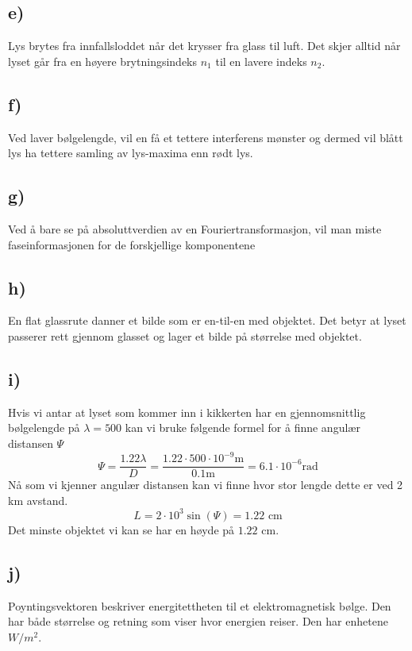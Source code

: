 \documentclass{article}
\begin{document}
  \subsection*{e)}
    Lys brytes fra innfallsloddet når det krysser fra glass til luft. Det skjer alltid når lyset går fra en høyere brytningsindeks $n_1$ til en lavere indeks $n_2$. 
  
  \subsection*{f)}
    Ved laver bølgelengde, vil en få et tettere interferens mønster og dermed vil blått lys ha tettere samling av lys-maxima enn rødt lys. 
    
  \subsection*{g)}
    Ved å bare se på absoluttverdien av en Fouriertransformasjon, vil man miste faseinformasjonen for de forskjellige komponentene
  
  \subsection*{h)}
    En flat glassrute danner et bilde som er en-til-en med objektet. Det betyr at lyset passerer rett gjennom glasset og lager et bilde på størrelse med objektet. 
    
  \subsection*{i)}
    Hvis vi antar at lyset som kommer inn i kikkerten har en gjennomsnittlig bølgelengde på $λ = 500$ kan vi bruke følgende formel for å finne angulær distansen $Ψ$
    \[
    Ψ = \frac{1.22 λ}{D} = \frac{1.22 ⋅ 500 ⋅ 10^{-9} \text{m}}{0.1 \text{m}} = 6.1 ⋅ 10^{-6} \text{rad} 
    \]
    Nå som vi kjenner angulær distansen kan vi finne hvor stor lengde dette er ved 2 km avstand. 
    \[
    L = 2 ⋅ 10^3 \sin (Ψ) = 1.22 \text{ cm}
    \]
    Det minste objektet vi kan se har en høyde på $1.22$ cm. 
  
  \subsection*{j)}
    Poyntingsvektoren beskriver energitettheten til et elektromagnetisk bølge. Den har både størrelse og retning som viser hvor energien reiser. Den har enhetene $W / m^2$. 
    
\end{document}
